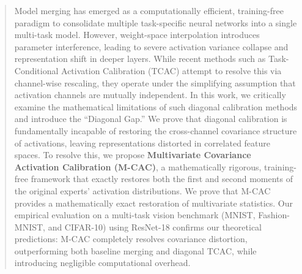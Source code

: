 \documentclass{article}
\theoremstyle{plain}
\theoremstyle{definition}
\theoremstyle{remark}
\begin{document}

\printAffiliationsAndNotice{}

\begin{abstract}
  Model merging has emerged as a computationally efficient, training-free paradigm to consolidate multiple task-specific neural networks into a single multi-task model. However, weight-space interpolation introduces parameter interference, leading to severe activation variance collapse and representation shift in deeper layers. While recent methods such as Task-Conditional Activation Calibration (TCAC) attempt to resolve this via channel-wise rescaling, they operate under the simplifying assumption that activation channels are mutually independent. In this work, we critically examine the mathematical limitations of such diagonal calibration methods and introduce the ``Diagonal Gap.'' We prove that diagonal calibration is fundamentally incapable of restoring the cross-channel covariance structure of activations, leaving representations distorted in correlated feature spaces. To resolve this, we propose \textbf{Multivariate Covariance Activation Calibration (M-CAC)}, a mathematically rigorous, training-free framework that exactly restores both the first and second moments of the original experts' activation distributions. We prove that M-CAC provides a mathematically exact restoration of multivariate statistics. Our empirical evaluation on a multi-task vision benchmark (MNIST, Fashion-MNIST, and CIFAR-10) using ResNet-18 confirms our theoretical predictions: M-CAC completely resolves covariance distortion, outperforming both baseline merging and diagonal TCAC, while introducing negligible computational overhead.
\end{abstract}
\end{document}
